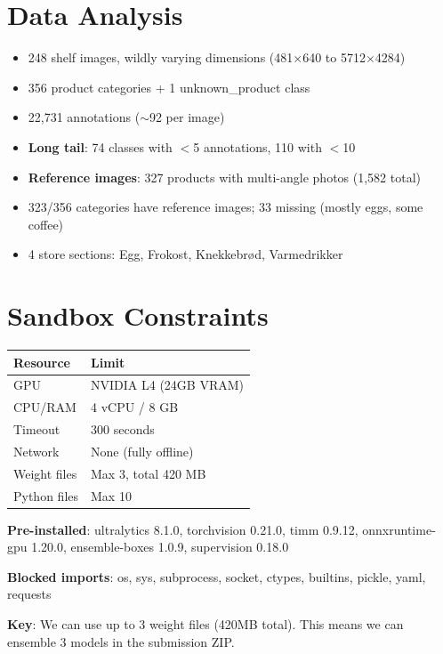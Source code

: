 \documentclass[11pt,a4paper]{article}
\begin{document}
\section{Data Analysis}

\begin{itemize}[nosep]
  \item 248 shelf images, wildly varying dimensions (481$\times$640 to 5712$\times$4284)
  \item 356 product categories + 1 unknown\_product class
  \item 22,731 annotations ($\sim$92 per image)
  \item \textbf{Long tail}: 74 classes with $<$5 annotations, 110 with $<$10
  \item \textbf{Reference images}: 327 products with multi-angle photos (1,582 total)
  \item 323/356 categories have reference images; 33 missing (mostly eggs, some coffee)
  \item 4 store sections: Egg, Frokost, Knekkebr\o d, Varmedrikker
\end{itemize}

\section{Sandbox Constraints}

\begin{tabular}{@{}ll@{}}
\toprule
\textbf{Resource} & \textbf{Limit} \\
\midrule
GPU & NVIDIA L4 (24GB VRAM) \\
CPU/RAM & 4 vCPU / 8 GB \\
Timeout & 300 seconds \\
Network & None (fully offline) \\
Weight files & Max 3, total 420 MB \\
Python files & Max 10 \\
\bottomrule
\end{tabular}

\medskip
\textbf{Pre-installed}: ultralytics 8.1.0, torchvision 0.21.0, timm 0.9.12, onnxruntime-gpu 1.20.0, ensemble-boxes 1.0.9, supervision 0.18.0

\textbf{Blocked imports}: os, sys, subprocess, socket, ctypes, builtins, pickle, yaml, requests

\textbf{Key}: We can use up to 3 weight files (420MB total). This means we can ensemble 3 models in the submission ZIP.
\end{document}
